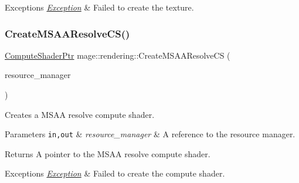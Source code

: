 \begin{DoxyExceptions}{Exceptions}
{\em \mbox{\hyperlink{classmage_1_1_exception}{Exception}}} & Failed to create the texture. \\
\hline
\end{DoxyExceptions}
\mbox{\label{namespacemage_1_1rendering_a0b3aa622ed9fb118712f9a885d45997d}} 
\subsubsection{\texorpdfstring{Create\+M\+S\+A\+A\+Resolve\+C\+S()}{CreateMSAAResolveCS()}}
{\footnotesize\ttfamily \mbox{\hyperlink{namespacemage_1_1rendering_ab3dc9f2114f2e9255b91d9c051da52ea}{Compute\+Shader\+Ptr}} mage\+::rendering\+::\+Create\+M\+S\+A\+A\+Resolve\+CS (\begin{DoxyParamCaption}\item[{\mbox{\hyperlink{classmage_1_1rendering_1_1_resource_manager}{Resource\+Manager}} \&}]{resource\+\_\+manager }\end{DoxyParamCaption})}

Creates a M\+S\+AA resolve compute shader.


\begin{DoxyParams}[1]{Parameters}
\mbox{\tt in,out}  & {\em resource\+\_\+manager} & A reference to the resource manager. \\
\hline
\end{DoxyParams}
\begin{DoxyReturn}{Returns}
A pointer to the M\+S\+AA resolve compute shader. 
\end{DoxyReturn}

\begin{DoxyExceptions}{Exceptions}
{\em \mbox{\hyperlink{classmage_1_1_exception}{Exception}}} & Failed to create the compute shader. \\
\hline
\end{DoxyExceptions}
\mbox{\label{namespacemage_1_1rendering_a379bf058f263791fb489c5c4cbea35e8}} 
